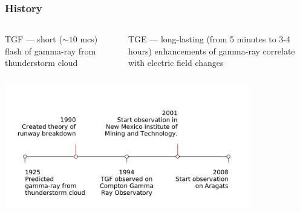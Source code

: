 \documentclass[8pt,pdf,hyperref={unicode}]{beamer}
\begin{document}
\begin{frame}
\frametitle{History}
	\begin{columns}
		\begin{column}{0.5\textwidth}
			{\large TGF --- short ($\sim 10$ mcs) flash of gamma-ray from thunderstorm cloud}
		\end{column}
		\begin{column}{0.5\textwidth}
		{\large 	TGE --- long-lasting (from 5 minutes to 3-4 hours)  enhancements of gamma-ray correlate with electric field changes  }
		\end{column}
	\end{columns}
\centering\includegraphics[width=0.8\textwidth]{timeline.pdf}

\end{frame}
\end{document}
